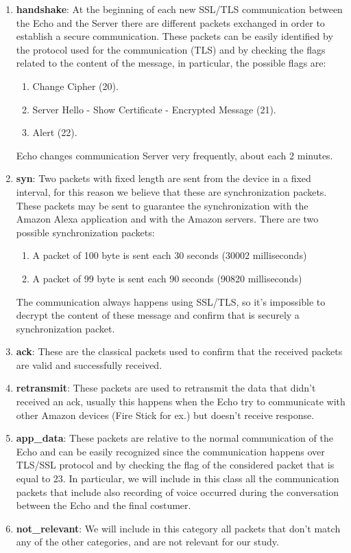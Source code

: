 \documentclass[sigconf]{acmart}
\begin{document}
    \begin{enumerate}
        \item \textbf{handshake}: At the beginning of each new SSL/TLS communication between the Echo and the Server there are different packets exchanged in order to establish a secure communication.
        These packets can be easily identified by the protocol used for the communication (TLS) and by checking the flags related to the content of the message, in particular, the possible flags are:
        \begin{enumerate}
            \item Change Cipher (20).
            \item Server Hello - Show Certificate - Encrypted Message (21).
            \item Alert (22).
        \end{enumerate}
        Echo changes communication Server very frequently, about each 2 minutes.
        \item \textbf{syn}: Two packets with fixed length are sent from the device in a fixed interval, for this reason we believe that these are synchronization packets.
        These packets may be sent to guarantee the synchronization with the Amazon Alexa application and with the Amazon servers.
        There are two possible synchronization packets:
        \begin{enumerate}
            \item A packet of 100 byte is sent each 30 seconds (30002 milliseconds)
            \item A packet of 99 byte is sent each 90 seconds (90820 milliseconds)
        \end{enumerate}
        The communication always happens using SSL/TLS, so it's impossible to decrypt the content of these message and confirm that is securely a synchronization packet.
        \item \textbf{ack}: These are the classical packets used to confirm that the received packets are valid and successfully received.
        \item \textbf{retransmit}: These packets are used to retransmit the data that didn't received an ack, usually this happens when the Echo try to communicate with other Amazon devices (Fire Stick for ex.) but doesn't receive response.
        \item \textbf{app\_data}: These packets are relative to the normal communication of the Echo and can be easily recognized since the communication happens over TLS/SSL protocol and by checking the flag of the considered packet that is equal to 23.
        In particular, we will include in this class all the communication packets that include also recording of voice occurred during the conversation between the Echo and the final costumer.
        \item \textbf{not\_relevant}: We will include in this category all packets that don't match any of the other categories, and are not relevant for our study.
    \end{enumerate}
\end{document}
